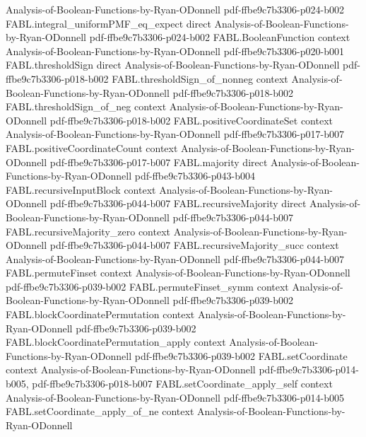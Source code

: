 \begin{theorem}
  {Analysis-of-Boolean-Functions-by-Ryan-ODonnell}
  {pdf-ffbe9c7b3306-p024-b002}
\proofstep
  {FABL.integral_uniformPMF_eq_expect}
  {direct}
  {Analysis-of-Boolean-Functions-by-Ryan-ODonnell}
  {pdf-ffbe9c7b3306-p024-b002}
\proofstep
  {FABL.BooleanFunction}
  {context}
  {Analysis-of-Boolean-Functions-by-Ryan-ODonnell}
  {pdf-ffbe9c7b3306-p020-b001}
\proofstep
  {FABL.thresholdSign}
  {direct}
  {Analysis-of-Boolean-Functions-by-Ryan-ODonnell}
  {pdf-ffbe9c7b3306-p018-b002}
\proofstep
  {FABL.thresholdSign_of_nonneg}
  {context}
  {Analysis-of-Boolean-Functions-by-Ryan-ODonnell}
  {pdf-ffbe9c7b3306-p018-b002}
\proofstep
  {FABL.thresholdSign_of_neg}
  {context}
  {Analysis-of-Boolean-Functions-by-Ryan-ODonnell}
  {pdf-ffbe9c7b3306-p018-b002}
\proofstep
  {FABL.positiveCoordinateSet}
  {context}
  {Analysis-of-Boolean-Functions-by-Ryan-ODonnell}
  {pdf-ffbe9c7b3306-p017-b007}
\proofstep
  {FABL.positiveCoordinateCount}
  {context}
  {Analysis-of-Boolean-Functions-by-Ryan-ODonnell}
  {pdf-ffbe9c7b3306-p017-b007}
\proofstep
  {FABL.majority}
  {direct}
  {Analysis-of-Boolean-Functions-by-Ryan-ODonnell}
  {pdf-ffbe9c7b3306-p043-b004}
\proofstep
  {FABL.recursiveInputBlock}
  {context}
  {Analysis-of-Boolean-Functions-by-Ryan-ODonnell}
  {pdf-ffbe9c7b3306-p044-b007}
\proofstep
  {FABL.recursiveMajority}
  {direct}
  {Analysis-of-Boolean-Functions-by-Ryan-ODonnell}
  {pdf-ffbe9c7b3306-p044-b007}
\proofstep
  {FABL.recursiveMajority_zero}
  {context}
  {Analysis-of-Boolean-Functions-by-Ryan-ODonnell}
  {pdf-ffbe9c7b3306-p044-b007}
\proofstep
  {FABL.recursiveMajority_succ}
  {context}
  {Analysis-of-Boolean-Functions-by-Ryan-ODonnell}
  {pdf-ffbe9c7b3306-p044-b007}
\proofstep
  {FABL.permuteFinset}
  {context}
  {Analysis-of-Boolean-Functions-by-Ryan-ODonnell}
  {pdf-ffbe9c7b3306-p039-b002}
\proofstep
  {FABL.permuteFinset_symm}
  {context}
  {Analysis-of-Boolean-Functions-by-Ryan-ODonnell}
  {pdf-ffbe9c7b3306-p039-b002}
\proofstep
  {FABL.blockCoordinatePermutation}
  {context}
  {Analysis-of-Boolean-Functions-by-Ryan-ODonnell}
  {pdf-ffbe9c7b3306-p039-b002}
\proofstep
  {FABL.blockCoordinatePermutation_apply}
  {context}
  {Analysis-of-Boolean-Functions-by-Ryan-ODonnell}
  {pdf-ffbe9c7b3306-p039-b002}
\proofstep
  {FABL.setCoordinate}
  {context}
  {Analysis-of-Boolean-Functions-by-Ryan-ODonnell}
  {pdf-ffbe9c7b3306-p014-b005,
    pdf-ffbe9c7b3306-p018-b007}
\proofstep
  {FABL.setCoordinate_apply_self}
  {context}
  {Analysis-of-Boolean-Functions-by-Ryan-ODonnell}
  {pdf-ffbe9c7b3306-p014-b005}
\proofstep
  {FABL.setCoordinate_apply_of_ne}
  {context}
  {Analysis-of-Boolean-Functions-by-Ryan-ODonnell}

\end{theorem}
